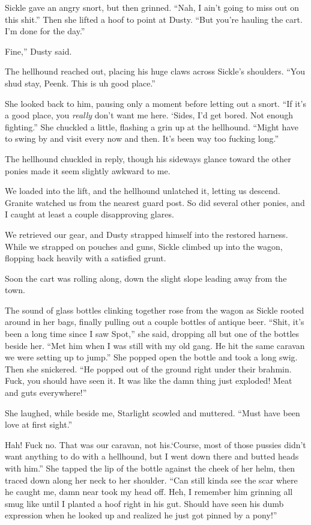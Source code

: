 Sickle gave an angry snort, but then grinned. “Nah, I ain’t going to miss out on this shit.” Then she lifted a hoof to point at Dusty. “But you’re hauling the cart. I’m done for the day.”

\leavevmode{}Fine,” Dusty said.

The hellhound reached out, placing his huge claws across Sickle’s shoulders. “You shud stay, Peenk. This is uh good place.”

She looked back to him, pausing only a moment before letting out a snort. “If it’s a good place, you \textit{really} don’t want me here. ‘Sides, I’d get bored. Not enough fighting.” She chuckled a little, flashing a grin up at the hellhound. “Might have to swing by and visit every now and then. It’s been way too fucking long.”

The hellhound chuckled in reply, though his sideways glance toward the other ponies made it seem slightly awkward to me.

We loaded into the lift, and the hellhound unlatched it, letting us descend. Granite watched us from the nearest guard post. So did several other ponies, and I caught at least a couple disapproving glares.

We retrieved our gear, and Dusty strapped himself into the restored harness. While we strapped on pouches and guns, Sickle climbed up into the wagon, flopping back heavily with a satisfied grunt.

Soon the cart was rolling along, down the slight slope leading away from the town.

The sound of glass bottles clinking together rose from the wagon as Sickle rooted around in her bags, finally pulling out a couple bottles of antique beer. “Shit, it’s been a long time since I saw Spot,” she said, dropping all but one of the bottles beside her. “Met him when I was still with my old gang. He hit the same caravan we were setting up to jump.” She popped open the bottle and took a long swig. Then she snickered. “He popped out of the ground right under their brahmin. Fuck, you should have seen it. It was like the damn thing just exploded! Meat and guts everywhere!”

She laughed, while beside me, Starlight scowled and muttered. “Must have been love at first sight.”

\leavevmode{}Hah! Fuck no. That was our caravan, not his.‘Course, most of those pussies didn’t want anything to do with a hellhound, but I went down there and butted heads with him.” She tapped the lip of the bottle against the cheek of her helm, then traced down along her neck to her shoulder. “Can still kinda see the scar where he caught me, damn near took my head off. Heh, I remember him grinning all smug like until I planted a hoof right in his gut. Should have seen his dumb expression when he looked up and realized he just got pinned by a pony!”


